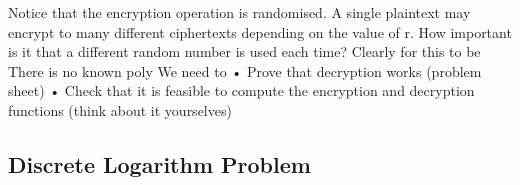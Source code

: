 Notice that the encryption operation is randomised. A single plaintext may encrypt to many different ciphertexts depending on the value of r. How important is it that a different random number is used each time?
Clearly for this to be%
There is no known poly%
We need to
• Prove that decryption works (problem sheet)
• Check that it is feasible to compute the encryption and decryption functions (think about it yourselves)

\subsection{Discrete Logarithm Problem}
%
